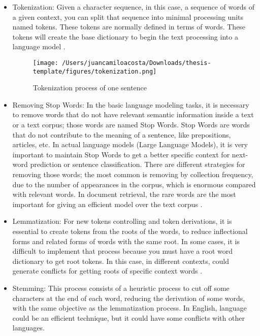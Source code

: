 \begin{itemize}
    \item Tokenization: Given a character sequence, in this case, a sequence of words of a given context, you can split that sequence into minimal processing units named tokens. These tokens are normally defined in terms of words. These tokens will create the base dictionary to begin the text processing into a language model \citet{information-retrieval}. 

    \begin{figure}[H]
    \centering
    \texttt{[image: /Users/juancamiloacosta/Downloads/thesis-template/figures/tokenization.png]}
    \caption{Tokenization process of one sentence \citet{information-retrieval} }
    \label{fig:tokenization}
    \end{figure}
    
    \item Removing Stop Words: In the basic language modeling tasks, it is necessary to remove words that do not have relevant semantic information inside a text or a text corpus; those words are named Stop Words. Stop Words are words that do not contribute to the meaning of a sentence, like prepositions, articles, etc. In actual language models (Large Language Models), it is very important to maintain Stop Words to get a better specific context for next-word prediction or sentence classification. There are different strategies for removing those words; the most common is removing by collection frequency, due to the number of appearances in the corpus, which is enormous compared with relevant words. In document retrieval, the rare words are the most important for giving an efficient model over the text corpus \citet{information-retrieval}. 
    \item Lemmatization: For new tokens controlling and token derivations, it is essential to create tokens from the roots of the words, to reduce inflectional forms and related forms of words with the same root. In some cases, it is difficult to implement that process because you must have a root word dictionary to get root tokens. In this case, in different contexts, could generate conflicts for getting roots of specific context words \cite{information-retrieval}.
    \item Stemming: This process consists of a heuristic process to cut off some characters at the end of each word, reducing the derivation of some words, with the same objective as the lemmatization process. In English, language could be an efficient technique, but it could have some conflicts with other languages.
\end{itemize}


